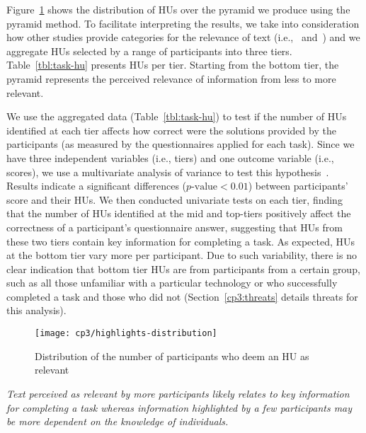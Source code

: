 Figure~\ref{fig:highlights-distribution} shows the distribution of HUs over the pyramid we produce using the pyramid method.
To facilitate interpreting the results,
we take into consideration how other studies provide categories for the relevance of
text (i.e.,~\cite{Petrosyan2015} and~\cite{Jiang2017}) and 
we aggregate HUs selected by a range of participants into three tiers.
Table~\ref{tbl:task-hu} presents HUs per tier.
Starting from the bottom tier, the pyramid represents the perceived relevance of information from less to more relevant.


We use the aggregated data (Table~\ref{tbl:task-hu}) to test if the number of HUs identified at each tier affects how correct were the solutions provided by the participants (as measured by the questionnaires applied for each task). 
Since we have three independent variables (i.e., tiers) and one outcome variable (i.e., scores),
we use a multivariate analysis of variance to test this hypothesis~\cite{wohlin2012}. 
Results indicate a significant differences ($p\text{-value} < 0.01$) between participants' score and their HUs.
We then conducted univariate tests on each tier,
finding that 
the number of HUs identified at the mid and top-tiers 
positively affect the correctness of a participant's questionnaire answer, 
suggesting that HUs from these two tiers contain key
information for completing a task.
As expected, HUs at the bottom tier vary more per participant.
Due to such variability, there is no clear indication
that bottom tier HUs are from participants from a certain group, such as all those
unfamiliar with a particular technology or  who successfully
completed a task and those who did not (Section~\ref{cp3:threats} details threats for this analysis).







\begin{figure}
    \centering
    \texttt{[image: cp3/highlights-distribution]}
    \caption{Distribution of the number of participants who deem an HU as relevant}
    \label{fig:highlights-distribution}
\end{figure}








\medskip
\begin{bluequote}
    \textit{Text perceived as relevant by more participants likely relates
    to key information for completing a task whereas information
    highlighted by a few participants may be more dependent on the knowledge of individuals.}
\end{bluequote}
